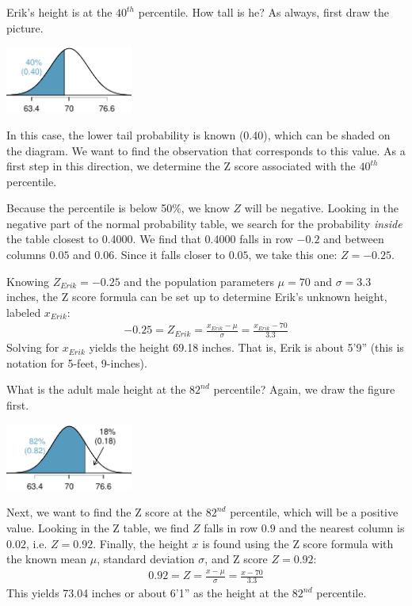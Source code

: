 \begin{example}{Erik's height is at the $40^{th}$ percentile. How tall is he?}\label{normalExam40Perc}
As always, first draw the picture.\vspace{-1mm}
\begin{center}
\includegraphics[height=22mm]{02/figures/height40Perc/height40Perc}\vspace{-1mm}
\end{center}
In this case, the lower tail probability is known (0.40), which can be shaded on the diagram. We want to find the observation that corresponds to this value. As a first step in this direction, we determine the Z score associated with the $40^{th}$ percentile.

Because the percentile is below 50\%, we know $Z$ will be negative. Looking in the negative part of the normal probability table, we search for the probability \emph{inside} the table closest to 0.4000. We find that 0.4000 falls in row $-0.2$ and between columns $0.05$ and $0.06$. Since it falls closer to $0.05$, we take this one: $Z=-0.25$.

Knowing $Z_{Erik}=-0.25$ and the population parameters $\mu=70$ and $\sigma=3.3$ inches, the Z score formula can be set up to determine Erik's unknown height, labeled $x_{Erik}$:
\begin{eqnarray*}
-0.25 = Z_{Erik} = \frac{x_{Erik} - \mu}{\sigma} = \frac{x_{Erik} - 70}{3.3}
\end{eqnarray*}
Solving for $x_{Erik}$ yields the height 69.18 inches. That is, Erik is about 5'9'' (this is notation for 5-feet, 9-inches).
\end{example}

\begin{example}{What is the adult male height at the $82^{nd}$ percentile?}
Again, we draw the figure first.\vspace{-1mm}
\begin{center}
\includegraphics[height=22mm]{02/figures/height82Perc/height82Perc}\vspace{-1mm}
\end{center}
Next, we want to find the Z score at the $82^{nd}$ percentile, which will be a positive value. Looking in the Z table, we find $Z$ falls in row $0.9$ and the nearest column is $0.02$, i.e. $Z=0.92$. Finally, the height $x$ is found using the Z score formula with the known mean $\mu$, standard deviation $\sigma$, and Z score $Z=0.92$:
\begin{eqnarray*}
0.92 = Z = \frac{x-\mu}{\sigma} = \frac{x - 70}{3.3}
\end{eqnarray*}
This yields 73.04 inches or about 6'1'' as the height at the $82^{nd}$ percentile.
\end{example}

